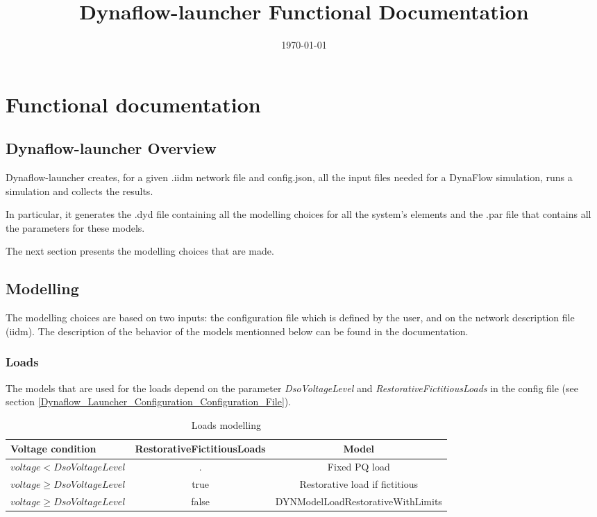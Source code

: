 \documentclass[a4paper, 12pt]{report}
\begin{document}
\title{Dynaflow-launcher Functional Documentation}
\date\today

\maketitle
\tableofcontents

\chapter{Functional documentation}

\section[Dynaflow-launcher Overview]{Dynaflow-launcher Overview}
Dynaflow-launcher creates, for a given .iidm network file and config.json, all the input files needed for a DynaFlow simulation, runs a simulation and collects the results.
\par In particular, it generates the .dyd file containing all the modelling choices for all the system's elements and the .par file that contains all the parameters for these models.
\par The next section presents the modelling choices that are made.

\section{Modelling}

The modelling choices are based on two inputs: the configuration file which is defined by the user, and on the network description file (iidm).
The description of the behavior of the models mentionned below can be found in the \Dynawo documentation.

\subsection{Loads}

The models that are used for the loads depend on the parameter \textit{DsoVoltageLevel} and \textit{RestorativeFictitiousLoads} in the config file (see section \ref{Dynaflow_Launcher_Configuration_Configuration_File}).
\begin{table}[h!]
\center
\begin{tabular}{ l | c | c }
\toprule
\textbf{{Voltage condition}} & \tiny{\textbf{RestorativeFictitiousLoads}} & \textbf{{Model}}\\
\midrule
\rowcolor{white}
 \small{$voltage < DsoVoltageLevel$} &  . & \small{Fixed PQ load} \\
 \rowcolor{gray!10}
 \small{$voltage \geq DsoVoltageLevel$} &  true & \small{Restorative load if fictitious} \\
  \rowcolor{white}
 \small{$voltage \geq DsoVoltageLevel$} &  false & \small{DYNModelLoadRestorativeWithLimits} \\
\bottomrule
\end{tabular}
\caption{Loads modelling}
\end{table}
\end{document}
